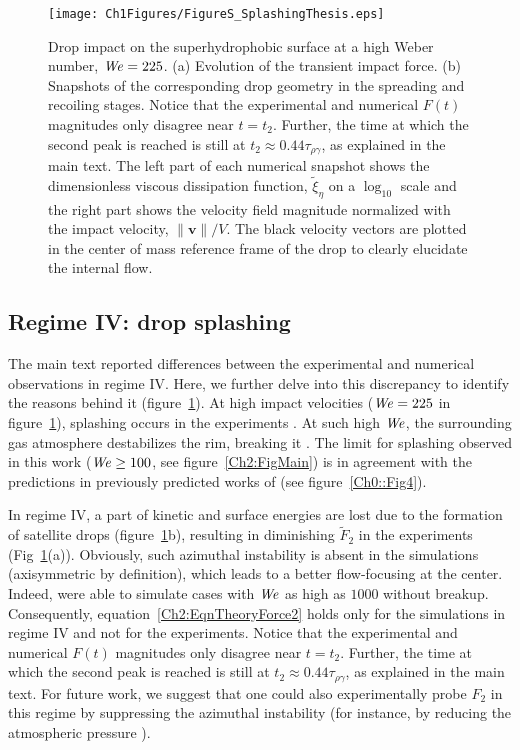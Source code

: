 \begin{subappendices}
	\begin{sidewaysfigure}
		\texttt{[image: Ch1Figures/FigureS\_SplashingThesis.eps]}
		\caption{Drop impact on the superhydrophobic surface at a high Weber number, $\mathit{We} = 225$. (a) Evolution of the transient impact force. (b) Snapshots of the corresponding drop geometry in the spreading and recoiling stages. Notice that the experimental and numerical $F(t)$ magnitudes only disagree near $t = t_2$. Further, the time at which the second peak is reached is still at $t_2 \approx 0.44\tau_{\rho\gamma}$, as explained in the main text. The left part of each numerical snapshot shows the dimensionless viscous dissipation function, $\tilde{\xi}_\eta$ on a $\log_{10}$ scale and the right part shows the velocity field magnitude normalized with the impact velocity, $\|\boldsymbol{v}\|/V$. The black velocity vectors are plotted in the center of mass reference frame of the drop to clearly elucidate the internal flow.}
		\label{Ch2:Fig_Splashing}
	\end{sidewaysfigure}
	
	\subsection{Regime IV: drop splashing}

	The main text reported differences between the experimental and numerical observations in regime IV. Here, we further delve into this discrepancy to identify the reasons behind it (figure~\ref{Ch2:Fig_Splashing}). At high impact velocities ($\mathit{We} = 225$ in figure~\ref{Ch2:Fig_Splashing}), splashing occurs in the experiments \cite{josserand2016drop}. At such high $\mathit{We}$, the surrounding gas atmosphere destabilizes the rim, breaking it  \cite{eggers2010drop, riboux2014experiments}. The limit for splashing observed in this work ($\mathit{We} \ge 100$, see figure~\ref{Ch2:FigMain}) is in agreement with the predictions in previously predicted works of \citet{derby2010inkjet, riboux2014experiments, lohse2022fundamental} (see figure~\ref{Ch0::Fig4}).  
	
	In regime IV, a part of kinetic and surface energies are lost due to the formation of satellite drops (figure~\ref{Ch2:Fig_Splashing}b), resulting in diminishing $\tilde{F}_2$ in the experiments (Fig~\ref{Ch2:Fig_Splashing}(a)). Obviously, such azimuthal instability is absent in the simulations (axisymmetric by definition), which leads to a better flow-focusing at the center. Indeed, \citet{eggers2010drop} were able to simulate cases with $\mathit{We}$ as high as $1000$ without breakup. Consequently, equation~\eqref{Ch2:EqnTheoryForce2} holds only for the simulations in regime IV and not for the experiments. Notice that the experimental and numerical $F(t)$ magnitudes only disagree near $t = t_2$. Further, the time at which the second peak is reached is still at $t_2 \approx 0.44\tau_{\rho\gamma}$, as explained in the main text. For future work, we suggest that one could also experimentally probe $F_2$ in this regime by suppressing the azimuthal instability (for instance, by reducing the atmospheric pressure \cite{xu2005drop}). 
	

\end{subappendices}
